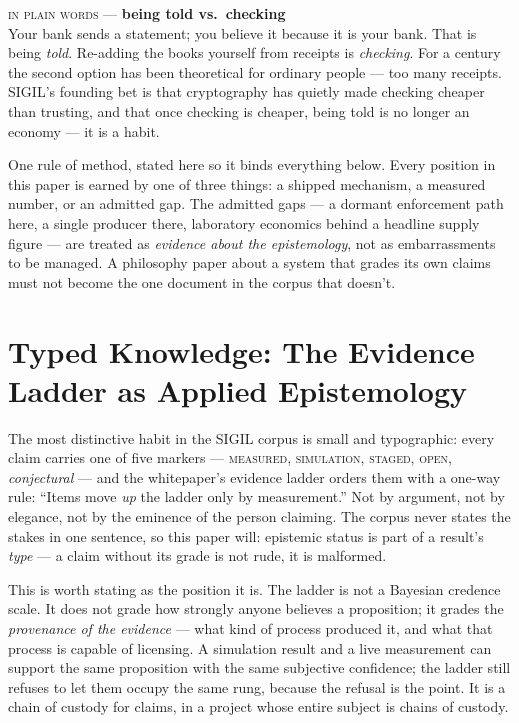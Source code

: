 \documentclass[10pt,a4paper]{article}
\newcommand{\layman}[3]{%
\begin{tcolorbox}[enhanced,
  interior style={left color=#1!9,right color=white},
  colframe=#1!45!slate,boxrule=0.5pt,arc=3pt,
  borderline west={2.5pt}{0pt}{#1},
  left=9pt,right=9pt,top=7pt,bottom=7pt]
{\scriptsize\textcolor{#1}{\textsc{in plain words}}\; — \;\textbf{\small #2}}\\[3pt]
\small #3
\end{tcolorbox}}
\begin{document}
\layman{sigilcyan}{being told vs.\ checking}{Your bank sends a statement; you believe
it because it is your bank. That is being \emph{told}. Re-adding the books yourself
from receipts is \emph{checking}. For a century the second option has been
theoretical for ordinary people — too many receipts. SIGIL's founding bet is that
cryptography has quietly made checking cheaper than trusting, and that once checking
is cheaper, being told is no longer an economy — it is a habit.}

One rule of method, stated here so it binds everything below. Every position in this
paper is earned by one of three things: a shipped mechanism, a measured number, or an
admitted gap. The admitted gaps — a dormant enforcement path here, a single producer
there, laboratory economics behind a headline supply figure — are treated as
\emph{evidence about the epistemology}, not as embarrassments to be managed. A
philosophy paper about a system that grades its own claims must not become the one
document in the corpus that doesn't.

\section{Typed Knowledge: The Evidence Ladder as Applied Epistemology}\label{sec:typed}

The most distinctive habit in the SIGIL corpus is small and typographic: every claim
carries one of five markers — \textsc{measured}, \textsc{simulation},
\textsc{staged}, \textsc{open}, \textit{conjectural} — and the whitepaper's evidence
ladder orders them with a one-way rule: ``Items move \emph{up} the ladder only by
measurement.'' Not by argument, not by elegance, not by the eminence of the person
claiming. The corpus never states the stakes in one sentence, so this paper will:
epistemic status is part of a result's \emph{type} — a claim without its grade is
not rude, it is malformed.

This is worth stating as the position it is. The ladder is not a Bayesian credence
scale. It does not grade how strongly anyone believes a proposition; it grades the
\emph{provenance of the evidence} — what kind of process produced it, and what that
process is capable of licensing. A simulation result and a live measurement can
support the same proposition with the same subjective confidence; the ladder still
refuses to let them occupy the same rung, because the refusal is the point. It is a
chain of custody for claims, in a project whose entire subject is chains of custody.
\end{document}
